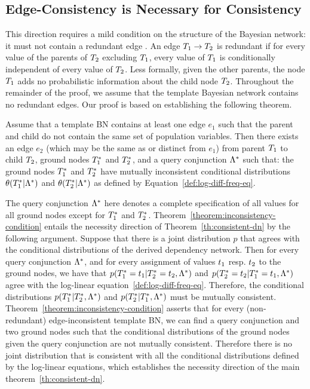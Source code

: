\documentclass[runningheads,a4paper]{llncs}
\begin{document}
\subsection{Edge-Consistency is Necessary for Consistency} 
This direction requires a mild condition on the structure of the Bayesian network: it must not contain a redundant edge \cite{Pearl1988}. An edge $T_{1}\rightarrow T_{2}$ is redundant if for every value of the parents of $T_{2}$ excluding $T_{1}$, every value of $T_{1}$ is conditionally independent of every value of $T_{2}$. Less formally, given the other parents, the node $T_{1}$ adds no probabilistic information about the child node $T_{2}$. Throughout the remainder of the proof, we assume that the template Bayesian network contains no redundant edges.
Our proof is based on establishing the following theorem. 

\begin{theorem}\label{theorem:inconsistency-condition}
Assume that a template BN contains at least one edge $e_1$ such that the parent and child do not contain the same set of population variables. Then there exists an edge $e_2$ (which may be the same as or distinct from $e_1$) from parent $T_{1}$ to child $T_{2}$, ground nodes $T_{1}^{*}\hspace{0.0ex}$ and $T_{2}^{*}\hspace{0.0ex}$,  and a query conjunction $\Lambda^{*}\hspace{0.0ex}$ such that: the ground nodes $T_{1}^{*}\hspace{0.0ex}$ and $T_{2}^{*}\hspace{0.0ex}$ have mutually inconsistent conditional distributions $\theta(T_{1}^{*}\hspace{0.0ex}|\Lambda^{*}\hspace{0.0ex})$ and $\theta(T_{2}^{*}\hspace{0.0ex}|\Lambda^{*}\hspace{0.0ex})$ as defined by Equation~\ref{def:log-diff-freq-eq}.
\end{theorem}

The query conjunction $\Lambda^{*}\hspace{0.0ex}$ here denotes a complete specification of all values for all ground nodes except for $T_{1}^{*}\hspace{0.0ex}$ and $T_{2}^{*}\hspace{0.0ex}$. Theorem~\ref{theorem:inconsistency-condition} entails the necessity direction of Theorem~\ref{th:consistent-dn} by the following argument. Suppose that there is a joint distribution $p$ that agrees with the conditional distributions of the derived dependency network. Then for every query conjunction $\Lambda^{*}\hspace{0.0ex}$, and for every assignment of values $t_{1}$ resp. $t_{2}$ to the ground nodes, we  have that $p(T_{1}^{*}\hspace{0.0ex}=t_{1}|T_{2}^{*}\hspace{0.0ex}=t_{2},\Lambda^{*}\hspace{0.0ex})$ and $p(T_{2}^{*}\hspace{0.0ex}=t_{2}|T_{1}^{*}\hspace{0.0ex}=t_{1},\Lambda^{*}\hspace{0.0ex})$ agree with the log-linear equation~\ref{def:log-diff-freq-eq}. Therefore, the conditional distributions $p(T_{1}^{*}\hspace{0.0ex}|T_{2}^{*}\hspace{0.0ex},\Lambda^{*}\hspace{0.0ex})$ and $p(T_{2}^{*}\hspace{0.0ex}|T_{1}^{*}\hspace{0.0ex},\Lambda^{*}\hspace{0.0ex})$ must be mutually consistent. 
Theorem~\ref{theorem:inconsistency-condition} asserts that for every (non-redundant) edge-inconsistent template BN, we can find a query conjunction and two ground nodes such that the conditional distributions of the ground nodes given the query conjunction are not mutually consistent. Therefore there is no joint distribution that is consistent with all the conditional distributions defined by the log-linear equations, which establishes the necessity direction of the main theorem~\ref{th:consistent-dn}. 
\end{document}
